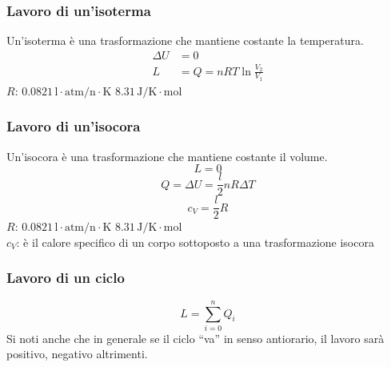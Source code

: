 \subsubsection{Lavoro di un'isoterma}
Un'isoterma è una trasformazione che mantiene costante la temperatura.
\begin{align*}
  \Delta U &= 0\\
  L &= Q = nRT\ln\frac{V_2}{V_1}
\end{align*}
\hyperref[tab:R]{$R$}: $0.0821\,\text{l}\cdot\text{atm/n}\cdot\text{K}$
$8.31\,\text{J/K}\cdot\text{mol}$\\

\subsubsection{Lavoro di un'isocora}
Un'isocora è una trasformazione che mantiene costante il volume.
\begin{equation*}
L = 0
\end{equation*}
\begin{equation*}
Q = \Delta U = \frac{l}{2}nR\Delta T
\end{equation*}
\begin{equation*}
c_V = \frac{l}{2}R
\end{equation*}
\hyperref[tab:R]{$R$}: $0.0821\,\text{l}\cdot\text{atm/n}\cdot\text{K}$
$8.31\,\text{J/K}\cdot\text{mol}$\\
$c_V$: è il calore specifico di un corpo sottoposto a una trasformazione isocora

\subsubsection{Lavoro di un ciclo}
\begin{center}
\end{center}
\begin{equation*}
L = \sum\limits_{i=0}^{n} Q_i
\end{equation*}
Si noti anche che in generale se il ciclo ``va'' in senso antiorario, il lavoro sarà positivo,
negativo altrimenti.

